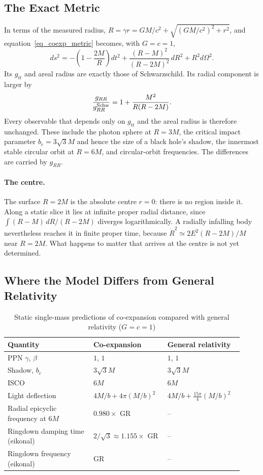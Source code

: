 \subsection{The Exact Metric}

In terms of the measured radius, $R=\gamma r=GM/c^2+\sqrt{(GM/c^2)^2+r^2}$, and equation~\eqref{eq_coexp_metric} becomes, with $G=c=1$,
\begin{equation}\label{eq_coexp_areal}
    ds^2=-\left(1-\frac{2M}{R}\right)dt^2+\frac{(R-M)^2}{(R-2M)^2}\,dR^2+R^2d\Omega^2 .
\end{equation}
Its $g_{tt}$ and areal radius are exactly those of Schwarzschild. Its radial component is larger by
\begin{equation}
    \frac{g_{RR}}{g_{RR}^{\rm Schw}}=1+\frac{M^2}{R(R-2M)} .
\end{equation}
Every observable that depends only on $g_{tt}$ and the areal radius is therefore unchanged. These include the photon sphere at $R=3M$, the critical impact parameter $b_c=3\sqrt3M$ and hence the size of a black hole's shadow, the innermost stable circular orbit at $R=6M$, and circular-orbit frequencies. The differences are carried by $g_{RR}$.

\paragraph{The centre.} The surface $R=2M$ is the absolute centre $r=0$: there is no region inside it. Along a static slice it lies at infinite proper radial distance, since $\int(R-M)\,dR/(R-2M)$ diverges logarithmically. A radially infalling body nevertheless reaches it in finite proper time, because $\dot R^2\simeq 2E^2(R-2M)/M$ near $R=2M$. What happens to matter that arrives at the centre is not yet determined.

\subsection{Where the Model Differs from General Relativity}

\begin{table}[h]
\caption{Static single-mass predictions of co-expansion compared with general relativity ($G=c=1$)}
\label{table_coexp}
\begin{tabular}{@{}p{0.34\linewidth}p{0.28\linewidth}p{0.30\linewidth}@{}}
\toprule
Quantity & Co-expansion & General relativity\\
\midrule
PPN $\gamma$, $\beta$ & $1$, $1$ & $1$, $1$\\
Shadow, $b_c$ & $3\sqrt3M$ & $3\sqrt3M$\\
ISCO & $6M$ & $6M$\\
Light deflection & $4M/b+4\pi(M/b)^2$ & $4M/b+\tfrac{15\pi}{4}(M/b)^2$\\
Radial epicyclic frequency at $6M$ & $0.980\times$ GR & --\\
Ringdown damping time (eikonal) & $2/\sqrt3\approx1.155\times$ GR & --\\
Ringdown frequency (eikonal) & GR & --\\
\bottomrule
\end{tabular}
\end{table}

